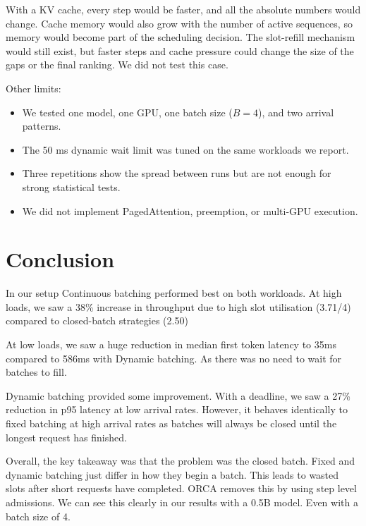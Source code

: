 \documentclass[12pt,a4paper]{article}
\begin{document}
With a KV cache, every step would be faster, and all the absolute numbers would change. Cache memory would also grow with the number of active sequences, so memory would become part of the scheduling decision. The slot-refill mechanism would still exist, but faster steps and cache pressure could change the size of the gaps or the final ranking. We did not test this case.

Other limits:
\begin{itemize}
    \item We tested one model, one GPU, one batch size ($B = 4$), and two arrival patterns.
    \item The 50 ms dynamic wait limit was tuned on the same workloads we report.
    \item Three repetitions show the spread between runs but are not enough for strong statistical tests.
    \item We did not implement PagedAttention, preemption, or multi-GPU execution.
\end{itemize}

\section{Conclusion}
In our setup Continuous batching performed best on both workloads. At high loads, we saw a 38\% increase in throughput due to high slot utilisation (3.71/4) compared to closed-batch strategies (2.50)

At low loads, we saw a huge reduction in median first token latency to 35ms compared to 586ms with Dynamic batching. As there was no need to wait for batches to fill.

Dynamic batching provided some improvement. With a deadline, we saw a 27\% reduction in p95 latency at low arrival rates. However, it behaves identically to fixed batching at high arrival rates as batches will always be closed until the longest request has finished.

Overall, the key takeaway was that the problem was the closed batch. Fixed and dynamic batching just differ in how they begin a batch. This leads to wasted slots after short requests have completed. ORCA removes this by using step level admissions. We can see this clearly in our results with a 0.5B model. Even with a batch size of 4.
\end{document}
